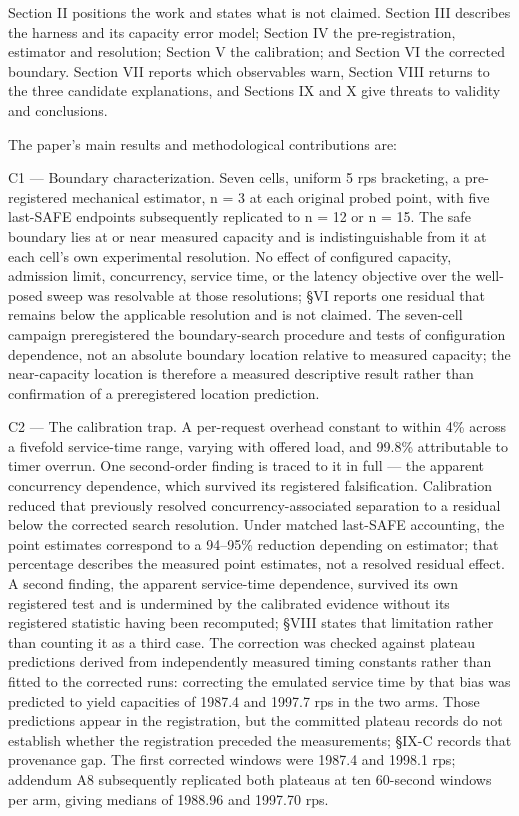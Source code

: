 \documentclass{ieeeaccess}
\begin{document}
Section II positions the work and states what is not claimed. Section III describes the harness and its capacity error model; Section IV the pre-registration, estimator and resolution; Section V the calibration; and Section VI the corrected boundary. Section VII reports which observables warn, Section VIII returns to the three candidate explanations, and Sections IX and X give threats to validity and conclusions.

The paper's main results and methodological contributions are:

C1 --- Boundary characterization. Seven cells, uniform 5 rps bracketing, a pre-registered mechanical estimator, n = 3 at each original probed point, with five last-SAFE endpoints subsequently replicated to n = 12 or n = 15. The safe boundary lies at or near measured capacity and is indistinguishable from it at each cell's own experimental resolution. No effect of configured capacity, admission limit, concurrency, service time, or the latency objective over the well-posed sweep was resolvable at those resolutions; \S{}VI reports one residual that remains below the applicable resolution and is not claimed. The seven-cell campaign preregistered the boundary-search procedure and tests of configuration dependence, not an absolute boundary location relative to measured capacity; the near-capacity location is therefore a measured descriptive result rather than confirmation of a preregistered location prediction.

C2 --- The calibration trap. A per-request overhead constant to within 4\% across a fivefold service-time range, varying with offered load, and 99.8\% attributable to timer overrun. One second-order finding is traced to it in full --- the apparent concurrency dependence, which survived its registered falsification. Calibration reduced that previously resolved concurrency-associated separation to a residual below the corrected search resolution. Under matched last-SAFE accounting, the point estimates correspond to a 94--95\% reduction depending on estimator; that percentage describes the measured point estimates, not a resolved residual effect. A second finding, the apparent service-time dependence, survived its own registered test and is undermined by the calibrated evidence without its registered statistic having been recomputed; \S{}VIII states that limitation rather than counting it as a third case. The correction was checked against plateau predictions derived from independently measured timing constants rather than fitted to the corrected runs: correcting the emulated service time by that bias was predicted to yield capacities of 1987.4 and 1997.7 rps in the two arms. Those predictions appear in the registration, but the committed plateau records do not establish whether the registration preceded the measurements; \S{}IX-C records that provenance gap. The first corrected windows were 1987.4 and 1998.1 rps; addendum A8 subsequently replicated both plateaus at ten 60-second windows per arm, giving medians of 1988.96 and 1997.70 rps.
\end{document}
